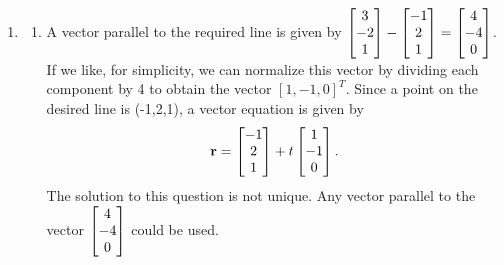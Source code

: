 \documentclass{article}
\begin{document}
\begin{enumerate}
\item
\begin{enumerate}
\item 

A vector parallel to the required line is given by $\begin{bmatrix} 3\\ -2\\1\end{bmatrix} - \begin{bmatrix} -1 \\2 \\ 1\end{bmatrix}  = \begin{bmatrix} 4 \\-4 \\0 \end{bmatrix}$. If we like, for simplicity, we can normalize this vector by dividing each component by 4 to obtain the vector $[1,-1,0]^T$. Since a point on the desired line is (-1,2,1), a vector equation is given by 
\begin{align*}
\mathbf{r}=\begin{bmatrix}-1 \\2 \\1\end{bmatrix}+t\begin{bmatrix}1 \\ -1 \\0 \end{bmatrix}.
\end{align*}
The solution to this question is not unique. Any vector parallel to the vector $\begin{bmatrix} 4 \\ -4 \\ 0 \end{bmatrix}$ could be used. 


\end{enumerate}
\end{enumerate}
\end{document}
